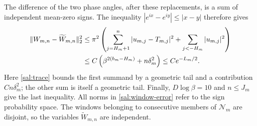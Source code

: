 The difference of the two phase angles, after these replacements, is
a sum of independent mean-zero signs.  The inequality
$|e^{ix}-e^{iy}|\le|x-y|$ therefore gives
\begin{align}
 \|W_{m,n}-\widetilde W_{m,n}\|_2^2
 &\le\pi^2\left(
       \sum_{j=H_m+1}^n|u_{m,j}-T_{m,j}|^2
                  +\sum_{j<-H_m}|u_{m,j}|^2\right)\notag\\
 &\le C\left(\beta^{2(b_m-H_m)}+n\delta_m^2\right)
 \le Ce^{-L_m/2}.\label{sal:window-error}
\end{align}
Here \eqref{sal:trace} bounds the first summand by a geometric tail
and a contribution $C n\delta_m^2$; the other sum is itself a geometric
tail.  Finally, $D\log\beta=10$ and $n\le J_m$ give the last inequality.
All norms in \eqref{sal:window-error} refer to the sign probability
space.  The windows belonging to consecutive members of $\mathcal N_m$
are disjoint, so the variables $\widetilde W_{m,n}$ are independent.

